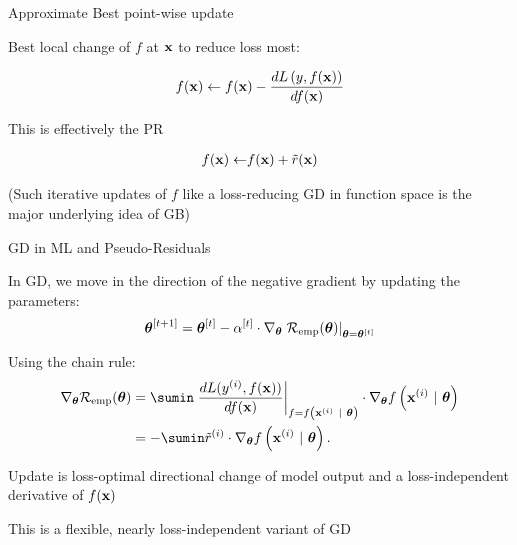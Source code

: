 \documentclass[11pt,compress,t,notes=noshow, xcolor=table]{beamer}
\begin{document}
\begin{framei}[sep=M, fs=normal]{Approximate Best point-wise update}

\item Best local change of $f$ at $\mathbf{x}$ to reduce loss most:

$$
f(\mathbf{x}) \leftarrow f(\mathbf{x}) - \frac{d L\left(y, f(\mathbf{x})\right)}{d f(\mathbf{x})} 
$$

\item This is effectively the PR 

\begin{align*}
f(\mathbf{x}) \leftarrow& f(\mathbf{x}) + \tilde{r}(\mathbf{x})\\ 
\end{align*}

\item (Such iterative updates of $f$ like a loss-reducing GD in function space is the major underlying idea of GB)

\end{framei}


\begin{framei}[sep=M]{GD in ML and Pseudo-Residuals}

\item In GD, we move in the direction of the negative gradient by updating the parameters: 
$$\bm{\theta}^{[t + 1]} = \bm{\theta}^{[t]} - \alpha^{[t]} \cdot \nabla_{\bm{\theta}} \left.\mathcal{R}_{\text{emp}}(\bm{\theta})\right|_{\bm{\theta} = \bm{\theta}^{[t]}}	$$
\item Using the chain rule:
\begin{align*}
\nabla_{\thetav} \risket &=\sumin \left.\frac{d L(\yi, \fx)}{d \fx} \right|_{f = \fxit} 
\cdot \nabla_{\thetav} \fxit \\ 
&= - \sumin \tilde r^{(i)} \cdot \nabla_{\thetav} \fxit.
\end{align*}
\item Update is loss-optimal directional change of model output 
and a loss-independent derivative of $f(\mathbf{x})$
\item This is a flexible, nearly loss-independent variant of GD


\end{framei}
\end{document}
